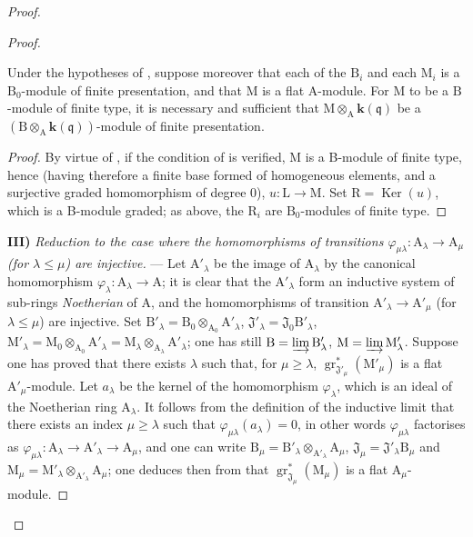 \begin{proof}
\begin{proof}
\begin{corollary}[11.2.9.4]
\label{IV.11.2.9.4}
Under the hypotheses of , suppose moreover that each of the $\mathrm{B}_i$ and each $\mathrm{M}_i$ is a $\mathrm{B}_0$-module of finite presentation, and that $\mathrm{M}$ is a flat $\mathrm{A}$-module. For $\mathrm{M}$ to be a $\mathrm{B}$-module of finite type, it is necessary and sufficient that $\mathrm{M}\otimes_\mathrm{A}\boldsymbol{k}(\mathfrak{q})$ be a $(\mathrm{B}\otimes_\mathrm{A}\boldsymbol{k}(\mathfrak{q}))$-module of finite presentation.
\end{corollary}

\begin{proof}
By virtue of , if the condition of  is verified, $\mathrm{M}$ is a B-module of finite type, hence (having therefore a finite base formed of homogeneous elements, and a surjective graded homomorphism of degree $0$), $u:\mathrm{L}\to\mathrm{M}$. Set $\mathrm{R}=\operatorname{Ker}(u)$, which is a B-module graded; as above, the $\mathrm{R}_i$ are $\mathrm{B}_0$-modules of finite type.
\end{proof}

\medskip
\noindent\textbf{III)} \emph{Reduction to the case where the homomorphisms of transitions $\varphi_{\mu\lambda}:\mathrm{A}_\lambda\to\mathrm{A}_\mu$ (for $\lambda\leqslant\mu$) are injective.} --- Let $\mathrm{A}'_\lambda$ be the image of $\mathrm{A}_\lambda$ by the canonical homomorphism $\varphi_\lambda:\mathrm{A}_\lambda\to\mathrm{A}$; it is clear that the $\mathrm{A}'_\lambda$ form an inductive system of sub-rings \emph{Noetherian} of $\mathrm{A}$, and the homomorphisms of transition $\mathrm{A}'_\lambda\to\mathrm{A}'_\mu$ (for $\lambda\leqslant\mu$) are injective. Set $\mathrm{B}'_\lambda=\mathrm{B}_0\otimes_{\mathrm{A}_0}\mathrm{A}'_\lambda$, $\mathfrak{J}'_\lambda=\mathfrak{J}_0\mathrm{B}'_\lambda$, $\mathrm{M}'_\lambda=\mathrm{M}_0\otimes_{\mathrm{A}_0}\mathrm{A}'_\lambda=\mathrm{M}_\lambda\otimes_{\mathrm{A}_\lambda}\mathrm{A}'_\lambda$; one has still $\mathrm{B}=\varinjlim\mathrm{B}'_\lambda$, $\mathrm{M}=\varinjlim\mathrm{M}'_\lambda$. Suppose one has proved that there exists $\lambda$ such that, for $\mu\geqslant\lambda$, $\operatorname{gr}^*_{\mathfrak{J}'_\mu}(\mathrm{M}'_\mu)$ is a flat $\mathrm{A}'_\mu$-module. Let $a_\lambda$ be the kernel of the homomorphism $\varphi_\lambda$, which is an ideal of the Noetherian ring $\mathrm{A}_\lambda$. It follows from the definition of the inductive limit that there exists an index $\mu\geqslant\lambda$ such that $\varphi_{\mu\lambda}(a_\lambda)=0$, in other words $\varphi_{\mu\lambda}$ factorises as $\varphi_{\mu\lambda}:\mathrm{A}_\lambda\to\mathrm{A}'_\lambda\to\mathrm{A}_\mu$, and one can write $\mathrm{B}_\mu=\mathrm{B}'_\lambda\otimes_{\mathrm{A}'_\lambda}\mathrm{A}_\mu$, $\mathfrak{J}_\mu=\mathfrak{J}'_\lambda\mathrm{B}_\mu$ and $\mathrm{M}_\mu=\mathrm{M}'_\lambda\otimes_{\mathrm{A}'_\lambda}\mathrm{A}_\mu$; one deduces then from  that $\operatorname{gr}^*_{\mathfrak{J}_\mu}(\mathrm{M}_\mu)$ is a flat $\mathrm{A}_\mu$-module.


\end{proof}
\end{proof}
